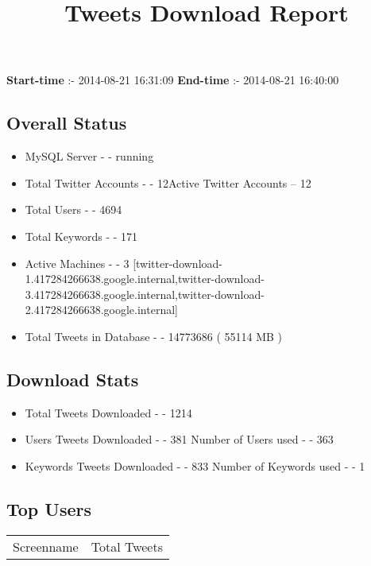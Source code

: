 \documentclass{article}\usepackage[T1]{fontenc}
\begin{document}
\title{\textbf{Tweets Download Report}}
               \date{}
                \maketitle
               \centerline{\textbf{Start-time} :- 2014-08-21 16:31:09 \hspace{40pt} \textbf{End-time} :- 2014-08-21 16:40:00}               \subsection*{Overall Status}                \begin{itemize}                \item MySQL Server - - running               \item Total Twitter Accounts - - 12\newline Active Twitter Accounts -- 12               \item Total Users - - 4694               \item Total Keywords - - 171               \item Active Machines - - 3 [twitter-download-1.417284266638.google.internal,twitter-download-3.417284266638.google.internal,twitter-download-2.417284266638.google.internal]               \item Total Tweets in Database - - 14773686 ( 55114 MB )               \end{itemize}               \subsection*{Download Stats}                \begin{itemize}                \item Total Tweets Downloaded - - 1214               \item Users Tweets Downloaded - - 381 \newline Number of Users used - - 363               \item Keywords Tweets Downloaded - - 833 \newline Number of Keywords used - - 1              \end{itemize}              \subsection*{Top Users}\begin{tabular}{|c|c|}         \hline         Screenname & Total Tweets \\ 

\end{tabular}
\end{document}
